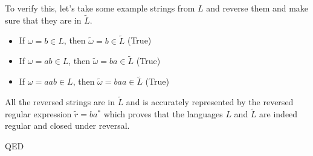 \documentclass[11pt, letterpaper]{article}
\begin{document}
\noindent To verify this, let's take some example strings from $L$ and reverse them and make sure that they are in $\tilde{L}$.
\begin{itemize}
	\item If $\omega = b \in L$, then $\tilde{\omega} = b \in \tilde{L}$ (True)
	\item If $\omega = ab \in L$, then $\tilde{\omega} = ba \in \tilde{L}$ (True)
	\item If $\omega = aab \in L$, then $\tilde{\omega} = baa \in \tilde{L}$ (True)
\end{itemize}

\noindent All the reversed strings are in $\tilde{L}$ and is accurately represented by the reversed regular expression $\tilde{r} = ba^*$ which proves that the languages $L$ and $\tilde{L}$ are indeed regular and closed under reversal.

\vspace{5mm}

\noindent QED
\end{document}
